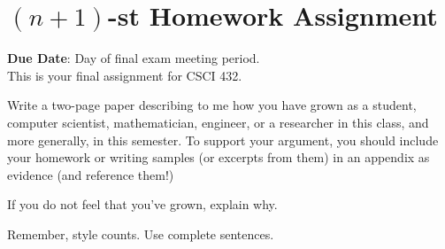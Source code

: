 \documentclass{article}
\begin{document}
\section*{$(n+1)$-st Homework Assignment}

{\bf{Due Date}}: Day of final exam meeting period.\\

This is your final assignment for CSCI 432.

Write a two-page paper describing to me how you have grown as a student,
computer
scientist, mathematician, engineer, or a researcher in this class, and more generally,
in this
semester.  To support your argument, you should include your
homework or writing samples (or excerpts from them) in an appendix as
evidence (and reference them!)

If you do not feel that you've grown,
explain why.

Remember, style counts. Use complete sentences.
\end{document}
